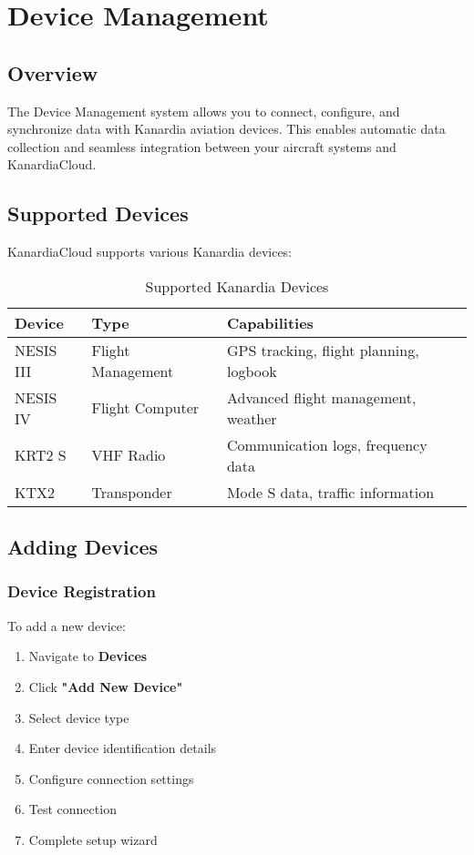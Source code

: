 \chapter{Device Management}

\section{Overview}

The Device Management system allows you to connect, configure, and synchronize data with Kanardia aviation devices. This enables automatic data collection and seamless integration between your aircraft systems and KanardiaCloud.

\section{Supported Devices}

KanardiaCloud supports various Kanardia devices:

\begin{table}[H]
\centering
\begin{tabular}{@{}llp{6cm}@{}}
\toprule
\textbf{Device} & \textbf{Type} & \textbf{Capabilities} \\
\midrule
NESIS III & Flight Management & GPS tracking, flight planning, logbook \\
NESIS IV & Flight Computer & Advanced flight management, weather \\
KRT2 S & VHF Radio & Communication logs, frequency data \\
KTX2 & Transponder & Mode S data, traffic information \\
\bottomrule
\end{tabular}
\caption{Supported Kanardia Devices}
\label{tab:supported_devices}
\end{table}

\section{Adding Devices}

\subsection{Device Registration}

To add a new device:

\begin{enumerate}
    \item Navigate to \textbf{Devices}
    \item Click \textbf{"Add New Device"}
    \item Select device type
    \item Enter device identification details
    \item Configure connection settings
    \item Test connection
    \item Complete setup wizard
\end{enumerate}

